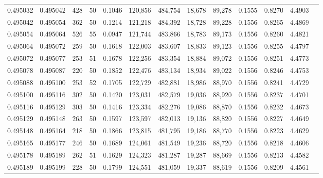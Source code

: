\begin{tabular}{rrrrrrrrrrrrr}
0.495032 & 0.495042 & 428 &  50 &                                     0.1046 & 120,856 & 484,754 &  18,678 &  89,278 & 0.1555 & 0.8270 & 4.4903 \\
0.495042 & 0.495054 & 362 &  50 &                                     0.1214 & 121,218 & 484,392 &  18,728 &  89,228 & 0.1556 & 0.8265 & 4.4869 \\
0.495054 & 0.495064 & 526 &  55 &                                     0.0947 & 121,744 & 483,866 &  18,783 &  89,173 & 0.1556 & 0.8260 & 4.4821 \\
0.495064 & 0.495072 & 259 &  50 &                                     0.1618 & 122,003 & 483,607 &  18,833 &  89,123 & 0.1556 & 0.8255 & 4.4797 \\
0.495072 & 0.495077 & 253 &  51 &                                     0.1678 & 122,256 & 483,354 &  18,884 &  89,072 & 0.1556 & 0.8251 & 4.4773 \\
0.495078 & 0.495087 & 220 &  50 &                                     0.1852 & 122,476 & 483,134 &  18,934 &  89,022 & 0.1556 & 0.8246 & 4.4753 \\
0.495088 & 0.495100 & 253 &  52 &                                     0.1705 & 122,729 & 482,881 &  18,986 &  88,970 & 0.1556 & 0.8241 & 4.4729 \\
0.495100 & 0.495116 & 302 &  50 &                                     0.1420 & 123,031 & 482,579 &  19,036 &  88,920 & 0.1556 & 0.8237 & 4.4701 \\
0.495116 & 0.495129 & 303 &  50 &                                     0.1416 & 123,334 & 482,276 &  19,086 &  88,870 & 0.1556 & 0.8232 & 4.4673 \\
0.495129 & 0.495148 & 263 &  50 &                                     0.1597 & 123,597 & 482,013 &  19,136 &  88,820 & 0.1556 & 0.8227 & 4.4649 \\
0.495148 & 0.495164 & 218 &  50 &                                     0.1866 & 123,815 & 481,795 &  19,186 &  88,770 & 0.1556 & 0.8223 & 4.4629 \\
0.495165 & 0.495177 & 246 &  50 &                                     0.1689 & 124,061 & 481,549 &  19,236 &  88,720 & 0.1556 & 0.8218 & 4.4606 \\
0.495178 & 0.495189 & 262 &  51 &                                     0.1629 & 124,323 & 481,287 &  19,287 &  88,669 & 0.1556 & 0.8213 & 4.4582 \\
0.495189 & 0.495199 & 228 &  50 &                                     0.1799 & 124,551 & 481,059 &  19,337 &  88,619 & 0.1556 & 0.8209 & 4.4561 \\

\end{tabular}
